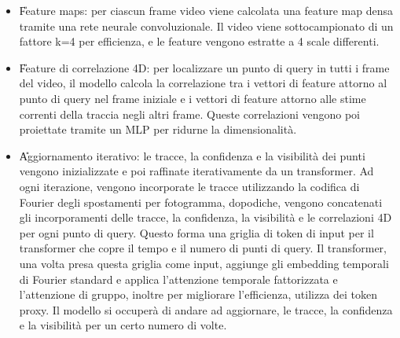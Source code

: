 \begin{itemize}
    \item \U{Feature maps}: per ciascun frame video viene calcolata una feature map densa tramite una rete neurale convoluzionale. Il video viene sottocampionato di un fattore k=4 per efficienza, e le feature vengono estratte a 4 scale differenti.
    \item \U{Feature di correlazione 4D}: per localizzare un punto di query in tutti i frame del video, il modello calcola la correlazione tra i vettori di feature attorno al punto di query nel frame iniziale e i vettori di feature attorno alle stime correnti della traccia negli altri frame. Queste correlazioni vengono poi proiettate tramite un MLP per ridurne la dimensionalità.
    \item \U{Aggiornamento iterativo}: le tracce, la confidenza e la visibilità dei punti vengono inizializzate e poi raffinate iterativamente da un transformer. Ad ogni iterazione, vengono incorporate le tracce utilizzando la codifica di Fourier degli spostamenti per fotogramma, dopodiche, vengono concatenati gli incorporamenti delle tracce, la confidenza, la visibilità e le correlazioni 4D per ogni punto di query. Questo forma una griglia di token di input per il transformer che copre il tempo e il numero di punti di query. Il transformer, una volta presa questa griglia come input, aggiunge gli embedding temporali di Fourier standard e applica l'attenzione temporale fattorizzata e l'attenzione di gruppo, inoltre per migliorare l'efficienza, utilizza dei token proxy. Il modello si occuperà di andare ad aggiornare, le tracce, la confidenza  e la visibilità per un certo numero di volte. \cite{cotracker3}
\end{itemize}
